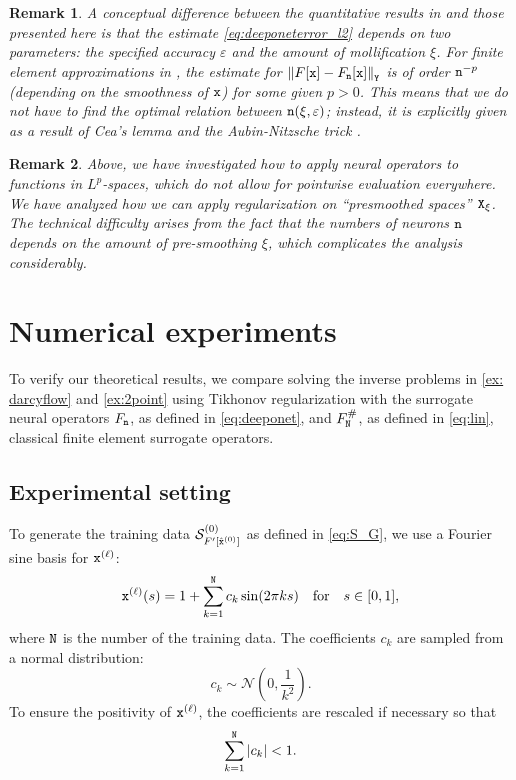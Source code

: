 \documentclass[10pt]{article}
\numberwithin{equation}{section}
\newtheorem{remark}[remark]{Remark}
\theoremstyle{nonumberplain}
\newcommand{\abs}[1]{\left|#1\right|}
\newcommand{\norm}[1]{\left\|#1\right\|}
\newcommand{\ve}{\varepsilon}
\newcommand{\X}{{\tt X}}
\newcommand{\Y}{{\tt Y}}
\newcommand{\n}{{\tt n}}
\newcommand{\x}{{\tt x}}
\newcommand{\no}{{\tt N}}
\begin{document}
 
\begin{remark}
	A conceptual difference between the quantitative results in \cite{NeuSch90} and those presented here is that the estimate \autoref{eq:deeponeterror_l2} depends on two parameters: the specified accuracy $\ve$ and the amount of mollification $\xi$. For finite element approximations in \cite{NeuSch90}, the estimate for $\norm{F[\x]-F_{\tt n}[\x]}_\Y$ is of order $\n^{-p}$ (depending on the smoothness of $\x$) for some given $p>0$. This means that we do not have to find the optimal relation between $\n(\xi,\ve)$; instead, it is explicitly given as a result of Cea's lemma \cite{Cia78} and the Aubin-Nitzsche trick \cite{Aub67,Nit68}.
\end{remark}
\begin{remark}
	Above, we have investigated how to apply neural operators to functions in $L^p$-spaces, which do not allow for pointwise evaluation everywhere. We have analyzed how we can apply regularization on ``presmoothed spaces'' $\X_\xi$. The technical difficulty arises from the fact that the numbers of neurons $\n$ depends on the amount of pre-smoothing $\xi$, which complicates the analysis considerably. 
\end{remark}

\section{Numerical experiments} \label{sec:numerics}
To verify our theoretical results, we compare solving the inverse problems in \autoref{ex: darcyflow} and \autoref{ex:2point} using Tikhonov regularization with the surrogate neural operators $F_{\tt n}$, as defined in \autoref{eq:deeponet}, and $F_\no^\#$, as defined in \autoref{eq:lin}, classical finite element surrogate operators.

\subsection*{Experimental setting}
To generate the training data $ \mathcal{S}_{F'[\hat{\x}^{(0)}]}^{(0)}$ as defined in \autoref{eq:S_G}, we use a Fourier sine basis for $\x^{(\ell)}$:
$$\x^{(\ell)}(s) = 1 + \sum_{k=1}^{\tt N} c_k\sin(2\pi k s) \quad \text{for} \quad s \in [0,1],$$
where ${\tt N}$ is the number of the training data. The coefficients $c_k$ are sampled from a normal distribution:
$$c_k \sim \mathcal{N}\left(0,\frac{1}{k^2}\right).$$
To ensure the positivity of $\x^{(\ell)}$, the coefficients are rescaled if necessary so that
$$\sum_{k=1}^{\tt N} \abs{c_k} < 1.$$
\end{document}
